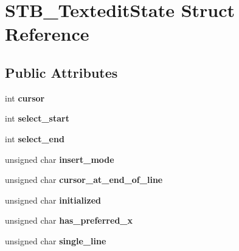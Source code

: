 \hypertarget{struct_s_t_b___textedit_state}{}\section{S\+T\+B\+\_\+\+Textedit\+State Struct Reference}
\label{struct_s_t_b___textedit_state}
\subsection*{Public Attributes}
\begin{DoxyCompactItemize}
\item 
int {\bfseries cursor}\hypertarget{struct_s_t_b___textedit_state_a7a1414f3286070306a5184f9473ccf9f}{}\label{struct_s_t_b___textedit_state_a7a1414f3286070306a5184f9473ccf9f}

\item 
int {\bfseries select\+\_\+start}\hypertarget{struct_s_t_b___textedit_state_a74d595403e0b6f99cd0163ee87f4344d}{}\label{struct_s_t_b___textedit_state_a74d595403e0b6f99cd0163ee87f4344d}

\item 
int {\bfseries select\+\_\+end}\hypertarget{struct_s_t_b___textedit_state_abf8b1b1064770e4579c5bb8c4a41d8f0}{}\label{struct_s_t_b___textedit_state_abf8b1b1064770e4579c5bb8c4a41d8f0}

\item 
unsigned char {\bfseries insert\+\_\+mode}\hypertarget{struct_s_t_b___textedit_state_af26029a4f1f76d043afd35072fabcb4b}{}\label{struct_s_t_b___textedit_state_af26029a4f1f76d043afd35072fabcb4b}

\item 
unsigned char {\bfseries cursor\+\_\+at\+\_\+end\+\_\+of\+\_\+line}\hypertarget{struct_s_t_b___textedit_state_a0e7ba5f610f5dc2d643bef0f223ada9c}{}\label{struct_s_t_b___textedit_state_a0e7ba5f610f5dc2d643bef0f223ada9c}

\item 
unsigned char {\bfseries initialized}\hypertarget{struct_s_t_b___textedit_state_a11a63150e95225aacd204d6ef160c0c0}{}\label{struct_s_t_b___textedit_state_a11a63150e95225aacd204d6ef160c0c0}

\item 
unsigned char {\bfseries has\+\_\+preferred\+\_\+x}\hypertarget{struct_s_t_b___textedit_state_aaca2d581ed565f86288038816274e007}{}\label{struct_s_t_b___textedit_state_aaca2d581ed565f86288038816274e007}

\item 
unsigned char {\bfseries single\+\_\+line}\hypertarget{struct_s_t_b___textedit_state_a63299aca2cb4e009dfa41cda5e651316}{}\label{struct_s_t_b___textedit_state_a63299aca2cb4e009dfa41cda5e651316}


\end{DoxyCompactItemize}
